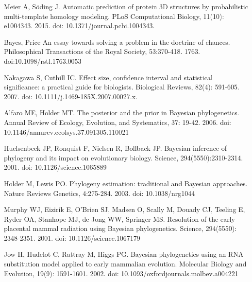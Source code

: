 \documentclass[10pt,letterpaper]{article}
\begin{document}
\begin{thebibliography}{10}

Meier A, Söding J.
\newblock Automatic prediction of protein 3D structures by probabilistic multi-template homology modeling.
\newblock PLoS Computational Biology, 11(10): e1004343. 2015. doi: 10.1371/journal.pcbi.1004343.

Bayes, Price
\newblock An essay towards solving a problem in the doctrine of chances.
\newblock Philosophical Transactions of the Royal Society, 53:370-418. 1763. doi:10.1098/rstl.1763.0053

Nakagawa S, Cuthill IC.
\newblock Effect size, confidence interval and statistical significance: a practical guide for biologists.
\newblock Biological Reviews, 82(4): 591-605. 2007. doi: 10.1111/j.1469-185X.2007.00027.x.

Alfaro ME, Holder MT.
\newblock The posterior and the prior in Bayesian phylogenetics.
\newblock Annual Review of Ecology, Evolution, and Systematics, 37: 19-42. 2006. doi: 10.1146/annurev.ecolsys.37.091305.110021

Huelsenbeck JP, Ronquist F, Nielsen R, Bollback JP.
\newblock Bayesian inference of phylogeny and its impact on evolutionary biology.
\newblock Science, 294(5550):2310-2314. 2001. doi: 10.1126/science.1065889

Holder M, Lewis PO.
\newblock Phylogeny estimation: traditional and Bayesian approaches.
\newblock Nature Reviews Genetics, 4:275-284. 2003. doi: 10.1038/nrg1044


Murphy WJ, Eizirik E, O'Brien SJ, Madsen O, Scally M, Douady CJ, Teeling E, Ryder OA, Stanhope MJ, de Jong WW, Springer MS.
\newblock Resolution of the early placental mammal radiation using Bayesian phylogenetics.
\newblock Science, 294(5550): 2348-2351. 2001. doi: 10.1126/science.1067179

Jow H, Hudelot C, Rattray M, Higgs PG.
\newblock Bayesian phylogenetics using an RNA substitution model applied to early mammalian evolution.
\newblock Molecular Biology and Evolution, 19(9): 1591-1601. 2002. doi: 10.1093/oxfordjournals.molbev.a004221


\end{thebibliography}
\end{document}
